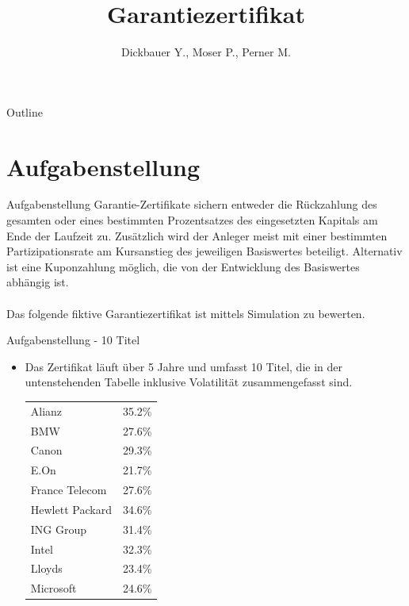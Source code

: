 

\title[BSP26 - Garantiezertifikat]{Garantiezertifikat}
\author{Dickbauer Y., Moser P., Perner M.}



\begin{frame}
  \titlepage
\end{frame}

\begin{frame}{Outline}
  \tableofcontents
\end{frame}

\section{Aufgabenstellung}
\begin{frame}{Aufgabenstellung}
Garantie-Zertifikate sichern entweder die Rückzahlung des gesamten oder eines bestimmten Prozentsatzes des eingesetzten Kapitals am Ende der Laufzeit zu. Zusätzlich wird der Anleger meist mit einer bestimmten Partizipationsrate am Kursanstieg des jeweiligen Basiswertes beteiligt. Alternativ ist eine Kuponzahlung möglich, die von der Entwicklung des Basiswertes abhängig ist.
\\~\\
Das folgende fiktive Garantiezertifikat ist mittels Simulation zu bewerten.
\end{frame}


\begin{frame}{Aufgabenstellung - 10 Titel}
\begin{itemize}
	\item Das Zertifikat läuft über 5 Jahre und umfasst 10 Titel, die in der untenstehenden Tabelle inklusive Volatilität zusammengefasst sind.
	\vspace{.2cm}
	\begin{center}
	\begin{tabular}{l|l}
	Alianz	 		& 35.2\% \\ 
	BMW 			& 27.6\% \\ 
	Canon 			& 29.3\% \\ 
	E.On			& 21.7\% \\ 
	France Telecom	& 27.6\% \\ 
	Hewlett Packard & 34.6\% \\ 
	ING Group 		& 31.4\% \\ 
	Intel 			& 32.3\% \\ 
	Lloyds 			& 23.4\% \\ 
	Microsoft		& 24.6\% \\  
	\end{tabular} 
	\end{center}
\end{itemize}
\end{frame}

